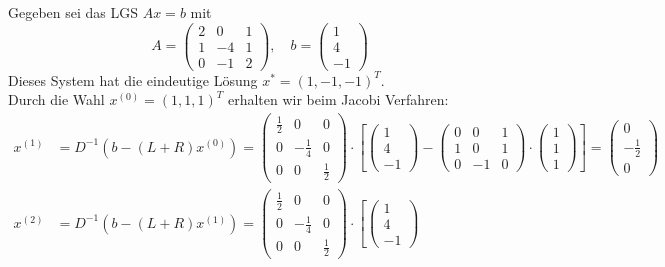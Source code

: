 \documentclass{article}
\begin{document}
\begin{egbox}
    Gegeben sei das LGS $Ax=b$ mit 
    \[A = \begin{pmatrix}
        2 & 0 & 1 \\ 1 & -4 & 1 \\ 0 & -1 & 2
    \end{pmatrix}, 
    \quad b=\begin{pmatrix}
        1 \\ 4 \\ -1
    \end{pmatrix}\]
    Dieses System hat die eindeutige Lösung $x^* = (1, -1, -1)^T$. \\
    Durch die Wahl $x^{(0)}=(1,1,1)^T$ erhalten wir beim Jacobi Verfahren:
    \begin{align*}
        x^{(1)} &= D^{-1}(b-(L+R)x^{(0)}) = \begin{pmatrix}
            \tfrac{1}{2} & 0 & 0 \\ 0 & -\tfrac{1}{4} & 0 \\ 0 & 0 & \tfrac{1}{2}
        \end{pmatrix} \cdot \left[\begin{pmatrix}
            1 \\ 4 \\ -1
        \end{pmatrix}-\begin{pmatrix}
            0 & 0 & 1 \\ 1 & 0 & 1 \\ 0 & -1 & 0
        \end{pmatrix}\cdot\begin{pmatrix}
            1 \\ 1 \\ 1
        \end{pmatrix}\right] = \begin{pmatrix}
            0 \\ -\tfrac{1}{2} \\ 0
        \end{pmatrix} \\
        x^{(2)} &= D^{-1}(b-(L+R)x^{(1)}) = \begin{pmatrix}
            \tfrac{1}{2} & 0 & 0 \\ 0 & -\tfrac{1}{4} & 0 \\ 0 & 0 & \tfrac{1}{2}
        \end{pmatrix} \cdot \left[\begin{pmatrix}
            1 \\ 4 \\ -1

\end{pmatrix}
\end{align*}
\end{egbox}
\end{document}

